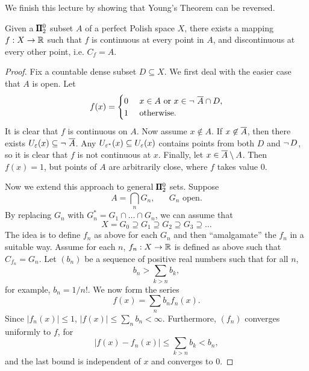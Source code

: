 We finish this lecture by showing that Young's Theorem can be reversed.

\begin{theorem}Given a $\pmb{\Pi}^0_2$ subset $A$ of a perfect Polish space $X$, there exists a mapping $f: X \to \mathbb{R}$ such that $f$ is continuous at every point in $A$, and discontinuous at every other point, i.e. $C_f = A$.

\end{theorem}\begin{proof}Fix a countable dense subset $D  \subseteq X$.
We first deal with the easier case that $A$ is open. Let
\begin{equation*}
f(x) = \begin{cases}
		0 & \text{ $x \in A$ or $x \in \neg \, \,\overline{A} \cap D$}, \\
		1 & \text{ otherwise}.
	\end{cases}
\end{equation*}
It is clear that $f$ is continuous on $A$. Now assume $x \not \in A$. If $x \not\in \overline{A}$, then there exists  $U_\varepsilon(x) \subseteq \neg \, \,\overline{A}$. Any $U_{\varepsilon^*}(x) \subseteq U_\varepsilon(x)$ contains points from both $D$ and $\neg \, D$, so it is clear that $f$ is not continuous at $x$. Finally, let $x \in \overline{A} \setminus A$. Then $f(x) = 1$, but points of $A$ are arbitrarily close, where $f$ takes value 0.

Now we extend this approach to general $\pmb{\Pi}^0_2$ sets. Suppose
\begin{equation*}
A = \bigcap_n G_n, \quad \text{ $G_n$ open}.
\end{equation*}
By replacing $G_n$ with $G_n^* = G_1 \cap \dots \cap G_n$, we can assume that
\begin{equation*}
X = G_0 \supseteq G_1 \supseteq G_2 \supseteq G_3 \supseteq \dots
\end{equation*}
The idea is to define $f_n$ as above for each $G_n$ and then ``amalgamate'' the $f_n$ in a suitable way.
Assume for each $n$, $f_n: X \to \mathbb{R}$ is defined as above such that $C_{f_n} = G_n$.
Let $(b_n)$ be a sequence of positive real numbers such that for all $n$,
\begin{equation*}
b_n > \sum_{k > n} b_k,
\end{equation*}
for example, $b_n = 1/n!$. We now form the series
\begin{equation*}
f(x) = \sum_n b_n f_n(x).
\end{equation*}
Since $|f_n(x)| \leq 1$, $|f(x)| \leq \sum_n b_n < \infty$. Furthermore, $(f_n)$ converges uniformly to $f$, for
\begin{equation*}
|f(x) - f_n(x)| \leq \sum_{k > n} b_k < b_n,
\end{equation*}
and the last bound is independent of $x$ and converges to 0.


\end{proof}
